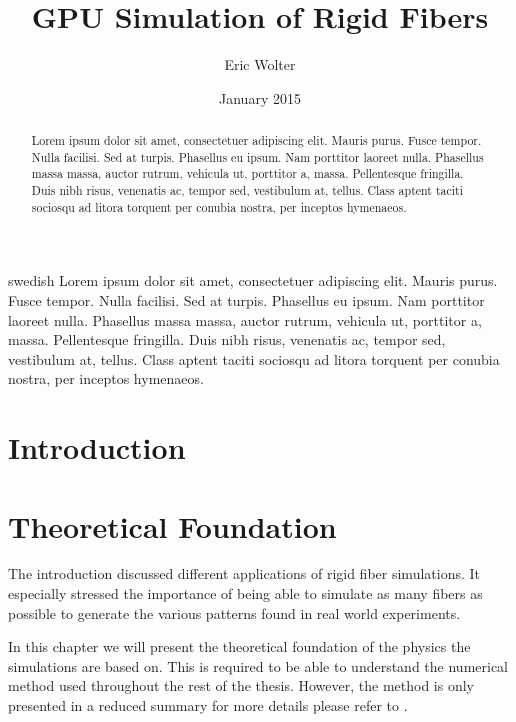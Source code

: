 \documentclass[a4paper,11pt]{kth-mag}
\title{GPU Simulation of Rigid Fibers}
\author{Eric Wolter}
\date{January 2015}
\begin{document}
\frontmatter
\pagestyle{empty}

\maketitle
{}
\begin{abstract}
Lorem ipsum dolor sit amet, consectetuer adipiscing elit. Mauris
purus. Fusce tempor. Nulla facilisi. Sed at turpis. Phasellus eu
ipsum. Nam porttitor laoreet nulla. Phasellus massa massa, auctor
rutrum, vehicula ut, porttitor a, massa. Pellentesque fringilla. Duis
nibh risus, venenatis ac, tempor sed, vestibulum at, tellus. Class
aptent taciti sociosqu ad litora torquent per conubia nostra, per
inceptos hymenaeos.
\end{abstract}

\clearpage


\begin{foreignabstract}{swedish}
Lorem ipsum dolor sit amet, consectetuer adipiscing elit. Mauris
purus. Fusce tempor. Nulla facilisi. Sed at turpis. Phasellus eu
ipsum. Nam porttitor laoreet nulla. Phasellus massa massa, auctor
rutrum, vehicula ut, porttitor a, massa. Pellentesque fringilla. Duis
nibh risus, venenatis ac, tempor sed, vestibulum at, tellus. Class
aptent taciti sociosqu ad litora torquent per conubia nostra, per
inceptos hymenaeos.
\end{foreignabstract}

\clearpage

\tableofcontents*

\clearpage

\listoflistings

\mainmatter
\pagestyle{newchap}

\chapter{Introduction}

\chapter{Theoretical Foundation}
\label{cha:theoretical_foundation}
The introduction discussed different applications of rigid fiber simulations. It especially stressed the importance of being able to simulate as many fibers as possible to generate the various patterns found in real world experiments.

In this chapter we will present the theoretical foundation of the physics the simulations are based on. This is required to be able to understand the numerical method used throughout the rest of the thesis. However, the method is only presented in a reduced summary for more details please refer to \cite{}.
\end{document}
